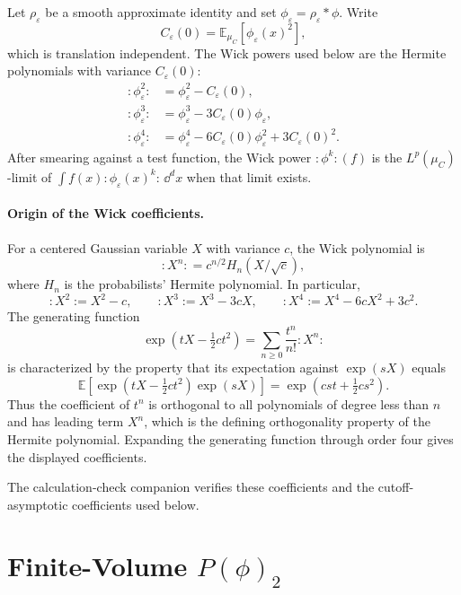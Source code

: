 \begin{definition}
\label{def:constructive-wick-powers-gaussian-regularization}
Let \(\rho_\varepsilon\) be a smooth approximate identity and set
\(\phi_\varepsilon=\rho_\varepsilon\ast\phi\).  Write
\[
  C_\varepsilon(0)
  =
  \mathbb E_{\mu_C}[\phi_\varepsilon(x)^2],
\]
which is translation independent.  The Wick powers used below are the
Hermite polynomials with variance \(C_\varepsilon(0)\):
\begin{align}
  :\!\phi_\varepsilon^2\!:
    &= \phi_\varepsilon^2-C_\varepsilon(0),\\
  :\!\phi_\varepsilon^3\!:
    &= \phi_\varepsilon^3-3C_\varepsilon(0)\phi_\varepsilon,\\
  :\!\phi_\varepsilon^4\!:
    &= \phi_\varepsilon^4
       -6C_\varepsilon(0)\phi_\varepsilon^2
       +3C_\varepsilon(0)^2 .
       \label{eq:constructive-wick-four}
\end{align}
After smearing against a test function, the Wick power
\(:\!\phi^k\!:(f)\) is the \(L^p(\mu_C)\)-limit of
\(\int f(x):\!\phi_\varepsilon(x)^k\!:\,\dd^dx\) when that limit exists.
\end{definition}

\paragraph{Origin of the Wick coefficients.}
For a centered Gaussian variable \(X\) with variance \(c\), the Wick
polynomial is
\[
  :\!X^n\!:
  =
  c^{n/2}H_n(X/\sqrt c),
\]
where \(H_n\) is the probabilists' Hermite polynomial.  In particular,
\[
  :\!X^2\!:=X^2-c,\qquad
  :\!X^3\!:=X^3-3cX,\qquad
  :\!X^4\!:=X^4-6cX^2+3c^2.
\]
The generating function
\[
  \exp(tX-\tfrac12ct^2)
  =
  \sum_{n\geq0} \frac{t^n}{n!}:\!X^n\!:
\]
is characterized by the property that its expectation against
\(\exp(sX)\) equals
\[
  \mathbb E\!\left[
    \exp(tX-\tfrac12ct^2)\exp(sX)
  \right]
  =
  \exp(cst+\tfrac12cs^2).
\]
Thus the coefficient of \(t^n\) is orthogonal to all polynomials of degree
less than \(n\) and has leading term \(X^n\), which is the defining
orthogonality property of the Hermite polynomial.  Expanding the generating
function through order four gives the displayed coefficients.

The calculation-check companion
 verifies
these coefficients and the cutoff-asymptotic coefficients used below.

\section{\texorpdfstring{Finite-Volume \(P(\phi)_2\)}{Finite-Volume P(phi)2}}

